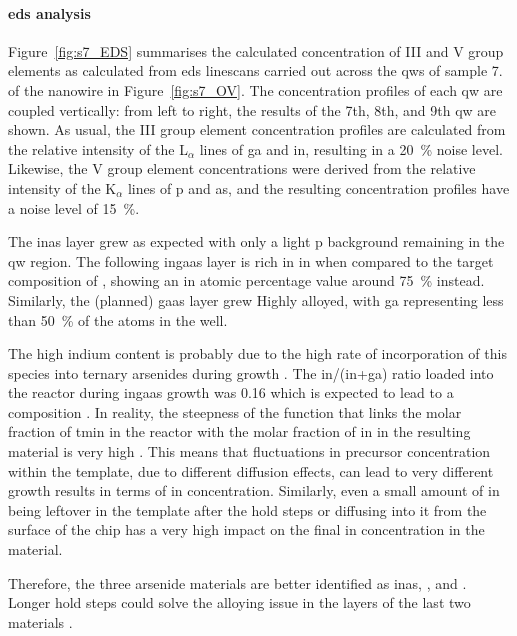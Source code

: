 \paragraph{\acs{eds} analysis} Figure~\ref{fig:s7_EDS} summarises the calculated concentration of III and V group elements as calculated from \acs{eds} linescans carried out across the \acl{qw}s of sample 7. of the nanowire in Figure~\ref{fig:s7_OV}. The concentration profiles of each \acl{qw} are coupled vertically: from left to right, the results of the 7th, 8th, and 9th \acl{qw} are shown. As usual, the III group element concentration profiles are calculated from the relative intensity of the L\(_\alpha\) lines of \acl{ga} and \acs{in}, resulting in a \qty{20}{\%} noise level. Likewise, the V group element concentrations were derived from the relative intensity of the K\(_\alpha\) lines of \acl{p} and \acl{as}, and the resulting concentration profiles have a noise level of \qty{15}{\%}.

The \acs{inas} layer grew as expected with only a light \acl{p} background remaining in the \acl{qw} region. The following \acs{ingaas} layer is rich in \acl{in} when compared to the target composition of , showing an \acl{in} atomic percentage value around \qty{75}{\%} instead. Similarly, the (planned) \acs{gaas} layer grew Highly alloyed, with \acl{ga} representing less than \qty{50}{\%} of the atoms in the well. 

The high indium content is probably due to the high rate of incorporation of this species into ternary arsenides during  growth \cite{Borg2019}. The \acs{in}/(\acs{in}+\acs{ga}) ratio loaded into the reactor during \acs{ingaas} growth was \num{0.16} which is expected to lead to a  composition \cite{Borg2019}. In reality, the steepness of the function that links the molar fraction of \acf{tmin} in the reactor with the molar fraction of \acl{in} in the resulting material is very high \cite{Borg2019}. This means that fluctuations in precursor concentration within the template, due to different diffusion effects, can lead to very different growth results in terms of \acl{in} concentration. Similarly, even a small amount of \acl{in} being leftover in the template after the hold steps or diffusing into it from the surface of the chip has a very high impact on the final \acl{in} concentration in the material. 

Therefore, the three arsenide materials are better identified as \acs{inas}, , and . Longer hold steps could solve the alloying issue in the layers of the last two materials \cite{Brugnolotto2023_2}.


